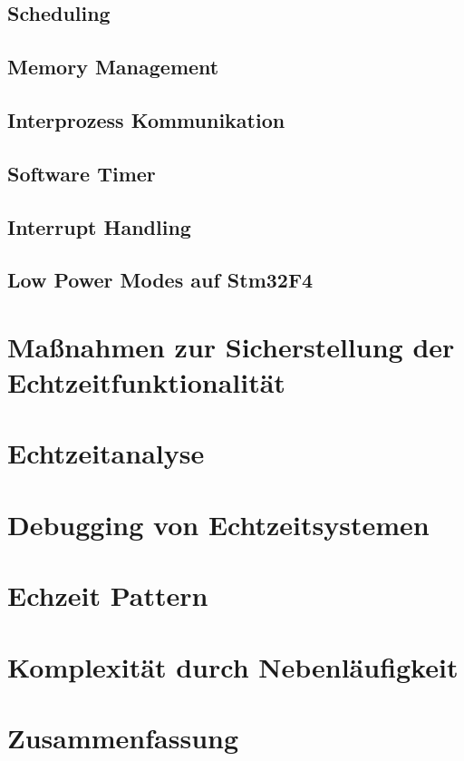 \documentclass[ngerman]{seminarvorlage}
\begin{document}
\subsection{Scheduling}
\subsection{Memory Management}
\subsection{Interprozess Kommunikation}
\subsection{Software Timer}
\subsection{Interrupt Handling}
\subsection{Low Power Modes auf Stm32F4}
\label{sec:Low Power Modes} 
\section{Maßnahmen zur Sicherstellung der Echtzeitfunktionalität}
\section{Echtzeitanalyse}
\label{sec:Echtzeitanalyse} 
\section{Debugging von Echtzeitsystemen} 
\section{Echzeit Pattern} 
\section{Komplexität durch Nebenläufigkeit} 
\section{Zusammenfassung}
\pagebreak

\end{document}
